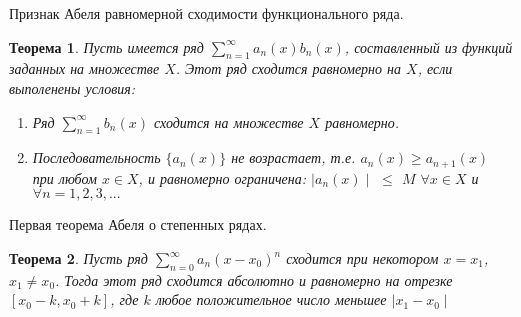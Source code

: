 \documentclass[12pt, a4paper]{article}
\newtheorem{thm}{Теорема}
\newenvironment{field}{}{\newpage}
\newif\ifnote
\newenvironment{note}{\notetrue}{\notefalse}
\begin{document}
\begin{note}
\begin{field}
Признак Абеля равномерной сходимости функционального ряда.
\end{field}
\begin{field}
\begin{thm}
	Пусть имеется ряд $\sum\limits_{n=1}^{\infty}a_n(x)b_n(x)$, составленный из  функций заданных на множестве $X$. Этот ряд сходится равномерно на $X$, если выполенены условия:
	\begin{enumerate}
		\item{Ряд $\sum\limits_{n=1}^{\infty}b_n(x)$ сходится на множестве $X$ равномерно.}
		\item{Последовательность $\{a_n(x)\}$ не возрастает, т.е. $a_n(x) \geq a_{n + 1}(x)$ при любом $x \in X$, и равномерно ограничена: $\mid a_n(x) \mid$ $\leq$ $M$ $\forall x \in X$ и $\forall n=1,2,3,...$  }
	\end{enumerate}

\end{thm}


\end{field}
\end{note}

\begin{note}
\begin{field}
Первая теорема Абеля о степенных рядах.
\end{field}
\begin{field}
\begin{thm}
	Пусть ряд $\sum\limits_{n=0}^{\infty}a_n(x-x_0)^n$ сходится при некотором $x = x_1$, $x_1 \neq x_0$. Тогда этот ряд сходится абсолютно и равномерно на отрезке $[x_0 - k, x_0 + k]$, где $k$ любое положительное число меньшее $\mid x_1 - x_0 \mid$
\end{thm}


\end{field}
\end{note}
\end{document}
